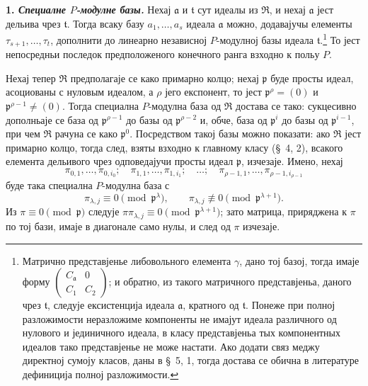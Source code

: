 \documentclass[11pt]{article}
\begin{document}
\setcounter{footnote}{26}

\textbf{1. \emph{Специалне $P$-модулне базы.}} Нехај $\mathfrak a$ и $\mathfrak t$ сут идеалы из $\mathfrak R$, и нехај $\mathfrak a$ јест дельива чрез $\mathfrak t$. Тогда всаку базу $a_1,\ldots,a_s$ идеала $\mathfrak a$ можно, додавајучы елементы $\tau_{s+1},\ldots,\tau_t$, дополнити до линеарно независној $P$-модулној базы идеала $\mathfrak t$.\footnote{Матрично представјенье либовольного елемента $\gamma$, дано тој базој, тогда имаје форму $\begin{pmatrix}C_{\mathfrak a}&0\\ C_1&C_2\end{pmatrix}$; и обратно, из такого матричного представјеньа, даного чрез $\mathfrak t$, следује ексистенција идеала $\mathfrak a$, кратного од $\mathfrak t$. Понеже при полној разложимости неразложиме компоненты не имајут идеала различного од нулового и јединичного идеала, в класу представјеньа тых компонентных идеалов тако представјенье не може настати. Ако додати связ меджу директној сумоју класов, даны в \S~5, 1, тогда достава се обична в литературе дефиниција полној разложимости.} То јест непосредньи последок предположеного конечного ранга взходно к польу $P$.

Нехај тепер $\mathfrak R$ предполагаје се како примарно колцо; нехај $\mathfrak p$ буде просты идеал, асоциованы с нуловым идеалом, а $\rho$ јего експонент, то јест $\mathfrak p^\rho=(0)$ и $\mathfrak p^{\rho-1}\ne(0)$. Тогда специална $P$-модулна база од $\mathfrak R$ достава се тако: сукцесивно дополньаје се база од $\mathfrak p^{\rho-1}$ до базы од $\mathfrak p^{\rho-2}$ и, обче, база од $\mathfrak p^i$ до базы од $\mathfrak p^{i-1}$, при чем $\mathfrak R$ рачуна се како $\mathfrak p^0$. Посредством такој базы можно показати: ако $\mathfrak R$ јест примарно колцо, тогда след, взяты взходно к главному класу (\S~4, 2), всакого елемента дельивого чрез одповедајучи просты идеал $\mathfrak p$, изчезаје. Имено, нехај
\[
\pi_{0,1},\ldots,\pi_{0,i_0};\quad
\pi_{1,1},\ldots,\pi_{1,i_1};\quad \ldots;\quad
\pi_{\rho-1,1},\ldots,\pi_{\rho-1,i_{\rho-1}}
\]
буде така специална $P$-модулна база с
\[
\pi_{\lambda,j}\equiv0\pmod{\mathfrak p^\lambda},\qquad
\pi_{\lambda,j}\not\equiv0\pmod{\mathfrak p^{\lambda+1}}.
\]
Из $\pi\equiv0\pmod{\mathfrak p}$ следује $\pi\pi_{\lambda,j}\equiv0\pmod{\mathfrak p^{\lambda+1}}$; зато матрица, приряджена к $\pi$ по тој бази, имаје в диагонале само нулы, и след од $\pi$ изчезаје.
\end{document}
